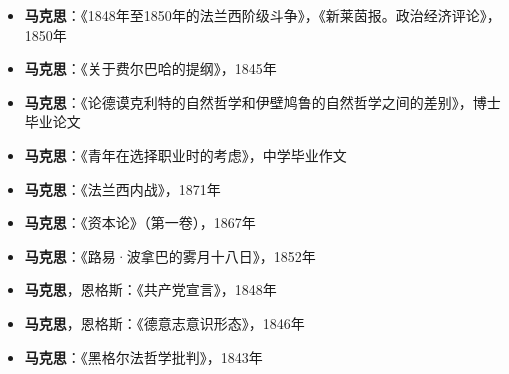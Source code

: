 \documentclass{SimpleResume}
\begin{document}
    \makeheader

        \begin{timeline}
        \end{timeline}


    \begin{itemize}
        \item \textbf{马克思}：《1848年至1850年的法兰西阶级斗争》，《新莱茵报。政治经济评论》，1850年
        \item \textbf{马克思}：《关于费尔巴哈的提纲》，1845年
        \item \textbf{马克思}：《论德谟克利特的自然哲学和伊壁鸠鲁的自然哲学之间的差别》，博士毕业论文
        \item \textbf{马克思}：《青年在选择职业时的考虑》，中学毕业作文
    \end{itemize}

        \begin{itemize}
            \item \textbf{马克思}：《法兰西内战》，1871年
            \item \textbf{马克思}：《资本论》（第一卷），1867年
            \item \textbf{马克思}：《路易·波拿巴的雾月十八日》，1852年
            \item \textbf{马克思}，恩格斯：《共产党宣言》，1848年
            \item \textbf{马克思}，恩格斯：《德意志意识形态》，1846年
            \item \textbf{马克思}：《黑格尔法哲学批判》，1843年
        \end{itemize}
\end{document}
